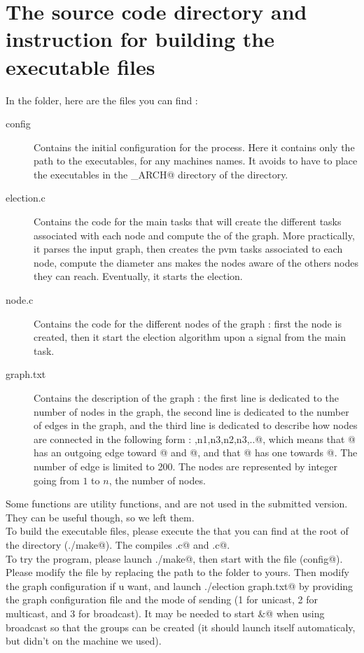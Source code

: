 \documentclass{article}
\begin{document}
\section{The source code directory and instruction for building the executable files}
In the \verb@code@ folder, here are the files you can find : 
\begin{description}
\item[config] Contains the initial configuration for the \verb@pvm@ process. Here it contains only the path to the executables, for any machines names. It avoids to have to place the executables in the \verb@PVM_ARCH@ directory of the \verb@pvm@ directory.
\item[election.c] Contains the code for the main tasks that will create the different \verb@pvm@ tasks associated with each node and compute the \verb@diameter@ of the graph. More practically, it parses the input graph, then creates the pvm tasks associated to each node, compute the diameter ans makes the nodes aware of the others nodes they can reach. Eventually, it starts the election.
\item[node.c] Contains the code for the different nodes of the graph : first the node is created, then it start the election algorithm upon a signal from the main task.
\item[graph.txt] Contains the description of the graph : the first line is dedicated to the number of nodes in the graph, the second line is dedicated to the number of edges in the graph, and the third line is dedicated to describe how nodes are connected in the following form : ,{n1,n3},{n2,n3},..@, which means that @ has an outgoing edge toward @ and @, and that @ has one towards @. The number of edge is limited to 200. The nodes are represented by integer going from $1$ to $n$, the number of nodes.
\end{description}

 Some functions are utility functions, and are not used in the submitted version. They can be useful though, so we left them.\\

To build the executable files, please execute the \verb@makefile@ that you can find at the root of the directory (\verb@./make@). The \verb@makefile@ compiles \verb@election.c@ and \verb@node.c@.\\

To try the program, please launch \verb@./make@, then start \verb@pvm@ with the \verb@config@ file (\verb@pvm config@). Please modify the \verb@config@ file by replacing the path to the \verb@code@ folder to yours. Then modify the graph configuration if u want, and launch \verb@./election graph.txt@ by providing the graph configuration file and the mode of sending (1 for unicast, 2 for multicast, and 3 for broadcast). It may be needed to start \verb@pvmgs&@ when using broadcast so that the groups can be created (it should launch itself automaticaly, but didn't on the machine we used).
\end{document}
